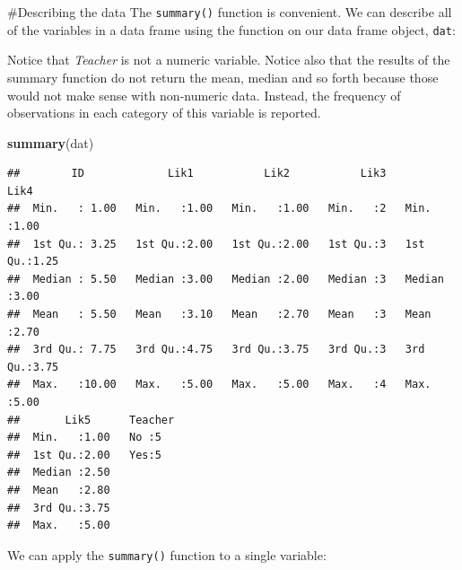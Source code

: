 \documentclass[]{tufte-handout}
\newenvironment{Shaded}{}{}
\newcommand{\KeywordTok}[1]{\textcolor[rgb]{0.00,0.44,0.13}{\textbf{#1}}}
\newcommand{\NormalTok}[1]{#1}
\newcommand{\OperatorTok}[1]{\textcolor[rgb]{0.40,0.40,0.40}{#1}}
\begin{document}
\#Describing the data The \texttt{summary()} function is convenient. We
can describe all of the variables in a data frame using the function on
our data frame object, \texttt{dat}:

\begin{marginfigure}
Notice that \emph{Teacher} is not a numeric variable. Notice also that
the results of the summary function do not return the mean, median and
so forth because those would not make sense with non-numeric data.
Instead, the frequency of observations in each category of this variable
is reported.
\end{marginfigure}

\begin{Shaded}
\begin{Highlighting}[]
\KeywordTok{summary}\NormalTok{(dat)}
\end{Highlighting}
\end{Shaded}

\begin{verbatim}
##        ID             Lik1           Lik2           Lik3        Lik4     
##  Min.   : 1.00   Min.   :1.00   Min.   :1.00   Min.   :2   Min.   :1.00  
##  1st Qu.: 3.25   1st Qu.:2.00   1st Qu.:2.00   1st Qu.:3   1st Qu.:1.25  
##  Median : 5.50   Median :3.00   Median :2.00   Median :3   Median :3.00  
##  Mean   : 5.50   Mean   :3.10   Mean   :2.70   Mean   :3   Mean   :2.70  
##  3rd Qu.: 7.75   3rd Qu.:4.75   3rd Qu.:3.75   3rd Qu.:3   3rd Qu.:3.75  
##  Max.   :10.00   Max.   :5.00   Max.   :5.00   Max.   :4   Max.   :5.00  
##       Lik5      Teacher
##  Min.   :1.00   No :5  
##  1st Qu.:2.00   Yes:5  
##  Median :2.50          
##  Mean   :2.80          
##  3rd Qu.:3.75          
##  Max.   :5.00
\end{verbatim}

We can apply the \texttt{summary()} function to a single variable:

\begin{Shaded}
\end{Shaded}
\end{document}
